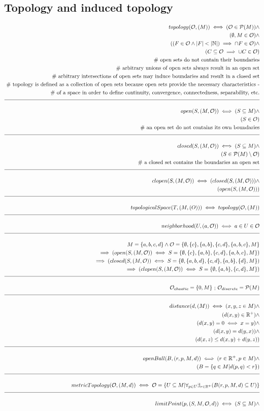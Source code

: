 \documentclass[a4paper]{article}
\newcommand{\eqComment}[1]{\text{  \# #1}}
\newcommand{\eqSep}{\text{ ;  }}
\newcommand{\n}{\\[1.5ex] \hline \nonumber \\[0ex]}
\newcommand{\m}{\nonumber \\}
\begin{document}
\subsection{Topology and induced topology}
\begin{tcolorbox}
\begin{align}
   topology(\mathcal{O}, (M)) \iff (\mathcal{O} \in \mathcal{P}(M)) \land
\m (\emptyset, M \in \mathcal{O}) \land
\m ((F \in \mathcal{O} \land |F| < |\mathbb{N}|) \implies \cap F \in \mathcal{O}) \land
\m  (C \subseteq \mathcal{O} \implies \cup C \in \mathcal{O})
\m \eqComment{open sets do not contain their boundaries}
\m \eqComment{arbitrary unions of open sets always result in an open set}
\m \eqComment{arbitrary intersections of open sets may induce boundaries and result in a closed set}
\m \eqComment{topology is defined as a collection of open sets because open sets provide the necessary characteristics -}
\m \eqComment{of a space in order to define continuity, convergence, connectedness, separability, etc.}
\n open(S, (M, \mathcal{O})) \iff (S \subseteq M) \land
\m (S \in \mathcal{O})
\m \eqComment{an open set do not contains its own boundaries}
\n closed(S, (M, \mathcal{O})) \iff (S \subseteq M) \land
\m (S \in \mathcal{P}(M) \setminus \mathcal{O})
\m \eqComment{a closed set contains the boundaries an open set}
\n clopen(S, (M, \mathcal{O})) \iff (closed(S, (M, \mathcal{O}))) \land
\m (open(S, (M, \mathcal{O}))) 
\n topologicalSpace(T, (M, \mathcal(O))) \iff topology(\mathcal{O}, (M))
\n neighborhood(U, (a, \mathcal{O})) \iff a \in U \in \mathcal{O}
\n M = \{a, b, c, d\} \land \mathcal{O} = \{\emptyset, \{c\}, \{a, b\}, \{c, d\}, \{a, b, c\}, M\}
\m \implies (open(S, (M, \mathcal{O})) \iff S = \{\emptyset, \{c\}, \{a, b\}, \{c, d\}, \{a, b, c\}, M\})
\m \implies (closed(S, (M, \mathcal{O})) \iff S = \{\emptyset, \{a, b, d\}, \{c, d\}, \{a, b\}, \{d\}, M\})
\m \implies (clopen(S, (M, \mathcal{O})) \iff S = \{\emptyset, \{a, b\}, \{c, d\}, M\})
\n \mathcal{O}_{chaotic} = \{0, M\} \eqSep \mathcal{O}_{discrete} = \mathcal{P}(M)
\n distance(d, (M)) \iff (x, y, z \in M) \land
\m (d(x, y) \in \mathbb{R}^+) \land
\m (d(x, y) = 0 \iff x = y) \land
\m (d(x, y) = d(y, x)) \land
\m (d(x, z) \leq d(x, y) + d(y, z))
\n openBall(B, (r, p, M, d)) \iff (r \in \mathbb{R}^+, p \in M) \land
\m (B = \{q \in M| d(p, q) < r\})
\n metricTopology(\mathcal{O}, (M, d)) \iff \mathcal{O} = \{U \subseteq M| \forall_{p \in U} \exists_{r \in \mathbb{R}^+} (B(r, p, M, d) \subseteq U)\}
\n limitPoint(p, (S, M, \mathcal{O}, d)) \iff (S \subseteq M) \land

\end{align}
\end{tcolorbox}
\end{document}
